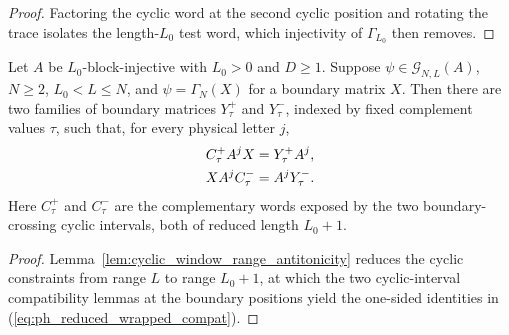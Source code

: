 \begin{proof}
    \leanok
    Factoring the cyclic word at the second cyclic position and rotating the
    trace isolates the length-$L_0$ test word, which injectivity of
    $\Gamma_{L_0}$ then removes.
\end{proof}

\begin{lemma}%
    \label{thm:reduced_wrapped_boundary_compatibilities}
    \leanok
    Let $A$ be $L_0$-block-injective with $L_0>0$ and $D\ge1$.
    Suppose $\psi\in\mathcal G_{N,L}(A)$, $N\ge2$, $L_0<L\le N$, and
    $\psi=\Gamma_N(X)$ for a boundary matrix $X$. Then there are two families
    of boundary matrices $Y^+_\tau$ and $Y^-_\tau$, indexed by fixed complement
    values $\tau$, such that, for every physical letter $j$,
    \begin{align}
        C^+_\tau A^j X & = Y^+_\tau A^j,
        \label{eq:ph_reduced_wrapped_compat}   \\
        X A^j C^-_\tau & = A^jY^-_\tau. \notag
    \end{align}
    Here $C^+_\tau$ and $C^-_\tau$ are the complementary words exposed by the
    two boundary-crossing cyclic intervals, both of reduced length $L_0+1$.
\end{lemma}

\begin{proof}
    \leanok
    Lemma~\ref{lem:cyclic_window_range_antitonicity} reduces the cyclic
    constraints from range $L$ to range $L_0+1$, at which the two
    cyclic-interval compatibility lemmas at the boundary positions yield the
    one-sided identities in (\ref{eq:ph_reduced_wrapped_compat}).
\end{proof}

